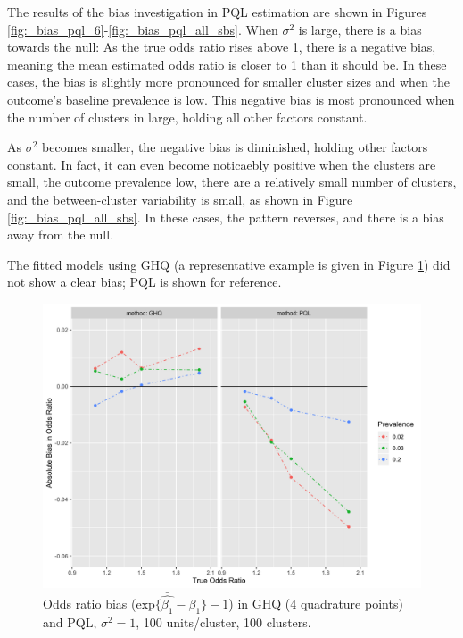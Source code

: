 \documentclass[Afour,times,sagev,doublespace]{sagej}
\begin{document}
The results of the bias investigation in PQL estimation are shown in Figures \ref{fig:_bias_pql_6}-\ref{fig:_bias_pql_all_sbs}. When $\sigma^2$ is large, there is a bias towards the null: As the true odds ratio rises above 1, there is a negative bias, meaning the mean estimated odds ratio is closer to 1 than it should be. In these cases, the bias is slightly more pronounced for smaller cluster sizes and when the outcome's baseline prevalence is low. This negative bias is most pronounced when the number of clusters in large, holding all other factors constant.

As $\sigma^2$ becomes smaller, the negative bias is diminished, holding other factors constant. In fact, it can even become noticaebly positive when the clusters are small, the outcome prevalence low, there are a relatively small number of clusters, and the between-cluster variability is small, as shown in Figure \ref{fig:_bias_pql_all_sbs}. In these cases, the pattern reverses, and there is a bias away from the null.

The fitted models using GHQ (a representative example is given in Figure \ref{fig:_bias_pql_ghq4}) did not show a clear bias; PQL is shown for reference.

\begin{figure}
\centering
\includegraphics[width=\linewidth]{_bias_pql_ghq4.png}
  \caption{Odds ratio bias ($\text{exp} \{ \bar{\hat{\beta_1}} - \beta_1 \} - 1$) in GHQ (4 quadrature points) and PQL, $\sigma^2=1$, 100 units/cluster, 100 clusters.}
  \label{fig:_bias_pql_ghq4}
\end{figure}
\end{document}
